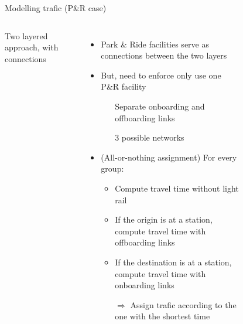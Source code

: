\documentclass{EESD}
\begin{document}
\begin{frame}{Modelling trafic (P\&R case)}
	\begin{columns}
		Two layered approach, with connections
		\begin{itemize}
			\item<-2> Park \& Ride facilities serve as connections between the two layers
			\item<2> But, need to enforce only use one P\&R facility \begin{itemize}
				\item[\textrightarrow] Separate onboarding and offboarding links
				\item[\textrightarrow] 3 possible networks
			\end{itemize}
			\item<3> (All-or-nothing assignment) For every group: \begin{itemize}
				\item Compute travel time without light rail
				\item If the origin is at a station, compute travel time with offboarding links 
				\item If the destination is at a station, compute travel time with onboarding links
				\item[$\Rightarrow$] Assign trafic according to the one with the shortest time
			\end{itemize}
		\end{itemize}
		\centering
		\begin{figure}
			\centering
\end{figure}
\end{columns}
\end{frame}
\end{document}
